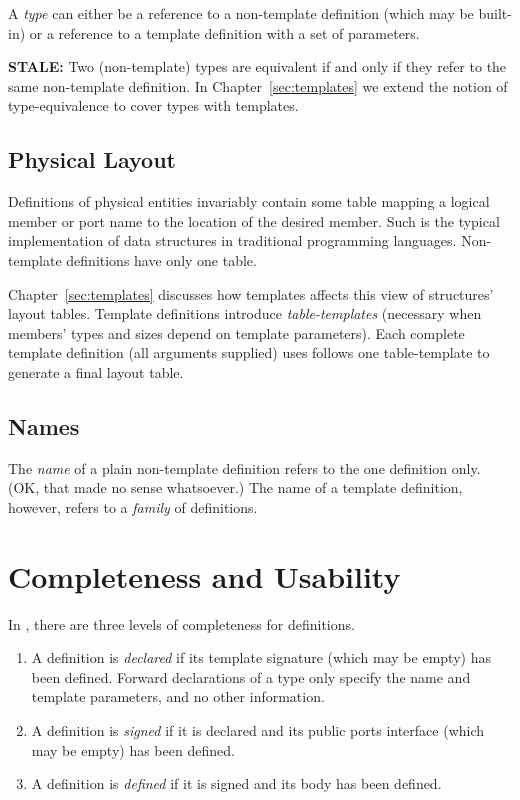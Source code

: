A \emph{type} can either be a reference to a non-template definition
(which may be built-in) or a reference to a template definition
with a set of parameters.  

\textbf{STALE:}
Two (non-template) types are equivalent if and only if 
they refer to the same non-template definition.  
In Chapter~\ref{sec:templates} we extend the notion of type-equivalence
to cover types with templates.  

\subsection{Physical Layout}
\label{sec:types:definition:layout}

Definitions of physical entities invariably contain some table mapping
a logical member or port name to the location of the desired member.  
Such is the typical implementation of data structures in traditional
programming languages.  
Non-template definitions have only one table.  

Chapter~\ref{sec:templates} discusses how templates affects this 
view of structures' layout tables.  
Template definitions introduce \emph{table-templates}
(necessary when members' types and sizes depend on template parameters).  
Each complete template definition (all arguments supplied) 
uses follows one table-template to generate a final layout table.  

\subsection{Names}
\label{sec:types:definition:name}

The \emph{name} of a plain non-template definition refers to the
one definition only.  (OK, that made no sense whatsoever.)
The name of a template definition, however, refers to a \emph{family}
of definitions.  

\section{Completeness and Usability}
\label{sec:types:completeness}

In \artxx, there are three levels of completeness for definitions.  

\begin{enumerate}
\item A definition is \emph{declared}
	if its template signature (which may be empty) has been defined.  
	Forward declarations of a type only specify the name
	and template parameters, and no other information.  
\item A definition is \emph{signed} if it is declared 
	and its public ports interface (which may be empty) has been defined.  
\item A definition is \emph{defined} if it is signed
	and its body has been defined.  
\end{enumerate}

